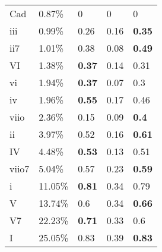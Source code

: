 \begin{tabular}{lllll}
Cad   & 0.87\%                 & 0                  & 0                         & 0                  \\
iii   & 0.99\%                 & 0.26               & 0.16                      & \textbf{0.35}      \\
ii7   & 1.01\%                 & 0.38               & 0.08                      & \textbf{0.49}      \\
VI    & 1.38\%                 & \textbf{0.37}      & 0.14                      & 0.31               \\
vi    & 1.94\%                 & \textbf{0.37}      & 0.07                      & 0.3                \\
iv    & 1.96\%                 & \textbf{0.55}      & 0.17                      & 0.46               \\
viio  & 2.36\%                 & 0.15               & 0.09                      & \textbf{0.4}       \\
ii    & 3.97\%                 & 0.52               & 0.16                      & \textbf{0.61}      \\
IV    & 4.48\%                 & \textbf{0.53}      & 0.13                      & 0.51               \\
viio7 & 5.04\%                 & 0.57               & 0.23                      & \textbf{0.59}      \\
i     & 11.05\%                & \textbf{0.81}      & 0.34                      & 0.79               \\
V     & 13.74\%                & 0.6                & 0.34                      & \textbf{0.66}      \\
V7    & 22.23\%                & \textbf{0.71}      & 0.33                      & 0.6                \\
I     & 25.05\%                & 0.83               & 0.39                      & \textbf{0.83}     
\end{tabular}
